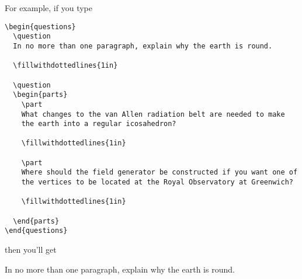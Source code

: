 \documentclass[12pt]{exam}
\begin{document}
For example, if you type
\begin{verbatim}
\begin{questions}
  \question 
  In no more than one paragraph, explain why the earth is round.

  \fillwithdottedlines{1in}
  
  \question
  \begin{parts}
    \part
    What changes to the van Allen radiation belt are needed to make
    the earth into a regular icosahedron?

    \fillwithdottedlines{1in}

    \part
    Where should the field generator be constructed if you want one of
    the vertices to be located at the Royal Observatory at Greenwich?

    \fillwithdottedlines{1in}

  \end{parts}
\end{questions}
\end{verbatim}
then you'll get
\begin{questions}
  \question 
  In no more than one paragraph, explain why the earth is round.

  \fillwithdottedlines{1in}
  
  \question
\end{questions}
\end{document}
